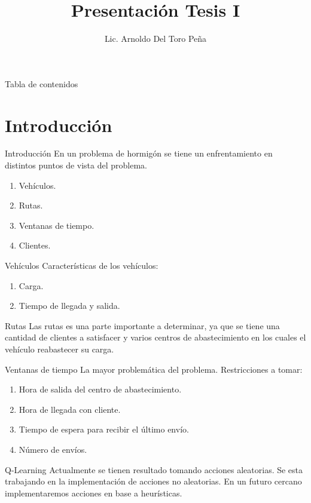 \documentclass{beamer}
\title{Presentación Tesis I}
\author{Lic. Arnoldo Del Toro Peña }
\institute[UANL]{Universidad Autónoma de Nuevo León}
\newcommand{\ql}{Q-Learning}
\begin{document}
	
	\begin{frame}
		\titlepage
	\end{frame}
	
	\begin{frame}{Tabla de contenidos}
		\tableofcontents
	\end{frame}
	
	\section{Introducción}
	
	\begin{frame}{Introducción}
		En un problema de hormigón se tiene un enfrentamiento en distintos puntos de vista del problema.
		
		\begin{enumerate}
			\item Vehículos.
			\item Rutas.
			\item Ventanas de tiempo.
			\item Clientes.
		\end{enumerate}
	
	\end{frame} 
	
	\begin{frame}{Vehículos}
		Características de los vehículos:
		\begin{enumerate}
			\item Carga.
			\item Tiempo de llegada y salida.
		\end{enumerate}
	\end{frame}

	\begin{frame}{Rutas}
		Las rutas es una parte importante a determinar, ya que se tiene una cantidad de clientes a satisfacer y varios centros de abastecimiento en los cuales el vehículo reabastecer su carga.
	\end{frame}
	
	\begin{frame}{Ventanas de tiempo}
		La mayor problemática del problema.
		Restricciones a tomar:
		\begin{enumerate}
			\item Hora de salida del centro de abastecimiento.
			\item Hora de llegada con cliente.
			\item Tiempo de espera para recibir el último envío.
			\item Número de envíos.
		\end{enumerate}
	\end{frame}
	
	\begin{frame}{\ql}
		Actualmente se tienen resultado tomando acciones aleatorias.
		\newline
		Se esta trabajando en la implementación de acciones no aleatorias.
		\newline
		En un futuro cercano implementaremos acciones en base a heurísticas.
	\end{frame}
		
	
	


	
\end{document}
